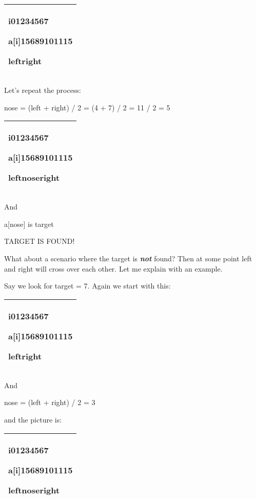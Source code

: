 \documentclass[
]{article}
\begin{document}
\begin{longtable}[]{@{}l@{}}
\toprule
\endhead
\begin{minipage}[t]{0.97\columnwidth}\raggedright
i01234567

a{[}i{]}15689101115

leftright\strut
\end{minipage}\tabularnewline
\bottomrule
\end{longtable}

Let's repeat the process:

nose = (left + right) / 2 = (4 + 7) / 2 = 11 / 2 = 5

\begin{longtable}[]{@{}l@{}}
\toprule
\endhead
\begin{minipage}[t]{0.97\columnwidth}\raggedright
i01234567

a{[}i{]}15689101115

leftnoseright\strut
\end{minipage}\tabularnewline
\bottomrule
\end{longtable}

And

a{[}nose{]} is target

TARGET IS FOUND!

What about a scenario where the target is \emph{\textbf{not}} found?
Then at some point left and right will cross over each other. Let me
explain with an example.

Say we look for target = 7. Again we start with this:

\begin{longtable}[]{@{}l@{}}
\toprule
\endhead
\begin{minipage}[t]{0.97\columnwidth}\raggedright
i01234567

a{[}i{]}15689101115

leftright\strut
\end{minipage}\tabularnewline
\bottomrule
\end{longtable}

And

nose = (left + right) / 2 = 3

and the picture is:

\begin{longtable}[]{@{}l@{}}
\toprule
\endhead
\begin{minipage}[t]{0.97\columnwidth}\raggedright
i01234567

a{[}i{]}15689101115

leftnoseright\strut
\end{minipage}\tabularnewline
\bottomrule
\end{longtable}
\end{document}

